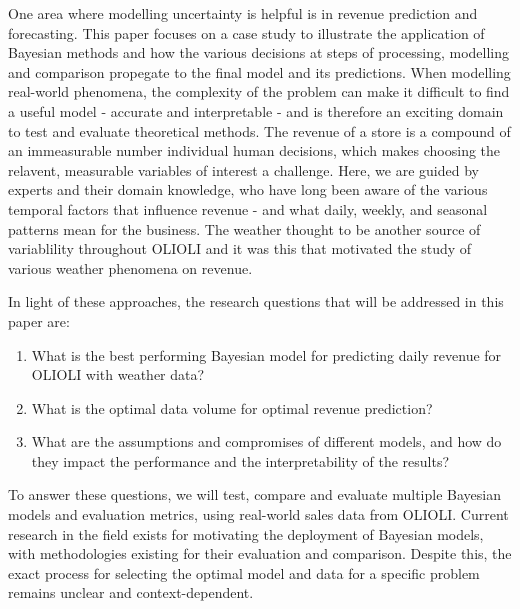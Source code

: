 One area where modelling uncertainty is helpful is in revenue prediction and forecasting. 
This paper focuses on a case study to illustrate the application of Bayesian methods
and how the various decisions at steps of processing, modelling and comparison propegate 
to the final model and its predictions.
When modelling real-world phenomena, the complexity of the problem can make it difficult 
to find a useful model - accurate and interpretable - and is therefore an exciting domain 
to test and evaluate theoretical methods.
The revenue of a store is a compound of an immeasurable number individual human
decisions, which makes choosing the relavent, measurable variables of interest
a challenge. 
Here, we are guided by experts and their domain knowledge, who
have long been aware of the various temporal factors that influence revenue -
and what daily, weekly, and seasonal patterns mean for the business. The
weather thought to be another source of variablility throughout OLIOLI and it
was this that motivated the study of various weather phenomena on revenue.


In light of these approaches, the research questions that will be addressed in this paper are:

\begin{enumerate}
    \item What is the best performing Bayesian model for predicting daily revenue for OLIOLI with weather data?
    \item What is the optimal data volume for optimal revenue prediction?
    \item What are the assumptions and compromises of different models, and how do they impact the performance and the interpretability of the results?
\end{enumerate}


To answer these questions, we will test, compare and evaluate multiple Bayesian
models and evaluation metrics, using real-world sales data from OLIOLI. Current
research in the field exists for motivating the deployment of Bayesian models,
with methodologies existing for their evaluation and comparison. Despite this,
the exact process for selecting the optimal model and data for a specific
problem remains unclear and context-dependent.

